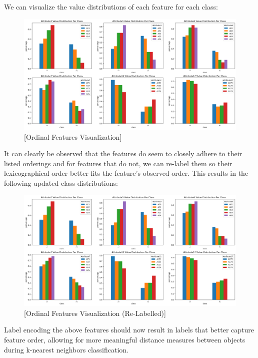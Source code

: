 \documentclass{article}
\begin{document}
    \newpage

    We can visualize the value distributions of each feature for each class:

    \begin{figure}[H]
        \centering
        \includegraphics[width=\textwidth, height=0.35\textheight]{./I_1_g_pa.png}
        \caption{[Ordinal Features Visualization]}
    \end{figure}

    It can clearly be observed that the features do seem to closely adhere to their listed orderings and for features that do not, we can re-label them so their
    lexicographical order better fits the feature's observed order. This results in the following updated class distributions:

    \begin{figure}[H]
        \centering
        \includegraphics[width=\textwidth, height=0.35\textheight]{./I_1_g_pb.png}
        \caption{[Ordinal Features Visualization (Re-Labelled)]}
    \end{figure}
    
    Label encoding the above features should now result in labels that better capture feature order, allowing for more meaningful distance measures between objects
    during k-nearest neighbors classification.
\end{document}
